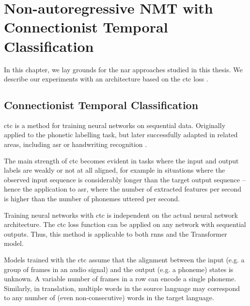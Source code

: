 \chapter{Non-autoregressive NMT with Connectionist Temporal Classification}
\label{chap:nar-nmt-ctc}


\noindent
In this chapter, we lay grounds for the \ac{nar} approaches studied in this
thesis. We describe our experiments with an architecture based on the \ac{ctc}
loss \citep{libovicky-helcl-2018-end}.  

\section{Connectionist Temporal Classification}
\label{sec:ctc}

\Ac{ctc} \citep{graves2006connectionist} is a method for training neural
networks on sequential data. Originally applied to the phonetic labelling task,
but later successfully adapted in related areas, including \ac{asr} or
handwriting recognition \citep{liwicki2007novel, eyben2009speech,
  graves2014towards}.

The main strength of \ac{ctc} becomes evident in tasks where the input and
output labels are weakly or not at all aligned, for example in situations where
the observed input sequence is considerably longer than the target output
sequence -- hence the application to \ac{asr}, where the number of extracted
features per second is higher than the number of phonemes uttered per second.

Training neural networks with \ac{ctc} is independent on the actual neural
network architecture. The \ac{ctc} loss function can be applied on any network
with sequential outputs. Thus, this method is applicable to both \acp{rnn} and
the Transformer model.

Models trained with the \ac{ctc} assume that the alignment between the input
(e.g. a group of frames in an audio signal) and the output (e.g. a phoneme)
states is unknown. A variable number of frames in a row can encode a single
phoneme. Similarly, in translation, multiple words in the source language may
correspond to any number of (even non-consecutive) words in the target
language.

